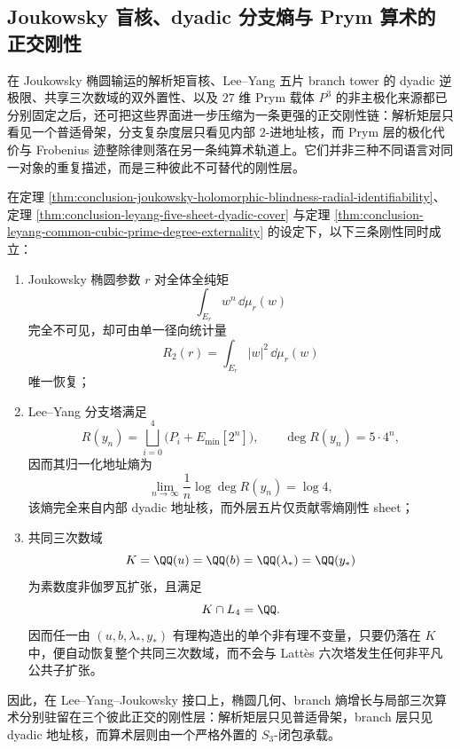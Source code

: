 \subsection{Joukowsky 盲核、dyadic 分支熵与 Prym 算术的正交刚性}\label{subsec:conclusion-joukowsky-branch-prym-address-entropy-orthogonality}

在 Joukowsky 椭圆输运的解析矩盲核、Lee--Yang 五片 branch tower 的 dyadic 逆极限、共享三次数域的双外置性、以及 \(27\) 维 Prym 载体 \(P^3\) 的非主极化来源都已分别固定之后，还可把这些界面进一步压缩为一条更强的正交刚性链：解析矩层只看见一个普适骨架，分支复杂度层只看见内部 \(2\)-进地址核，而 Prym 层的极化代价与 Frobenius 迹整除律则落在另一条纯算术轨道上。它们并非三种不同语言对同一对象的重复描述，而是三种彼此不可替代的刚性层。

\begin{theorem}\label{thm:conclusion-joukowsky-branch-cubic-three-layer-orthogonality}
在定理 \ref{thm:conclusion-joukowsky-holomorphic-blindness-radial-identifiability}、定理 \ref{thm:conclusion-leyang-five-sheet-dyadic-cover} 与定理 \ref{thm:conclusion-leyang-common-cubic-prime-degree-externality} 的设定下，以下三条刚性同时成立：
\begin{enumerate}
  \item Joukowsky 椭圆参数 \(r\) 对全体全纯矩
  \[
  \int_{E_r} w^n\,\dd\mu_r(w)
  \]
  完全不可见，却可由单一径向统计量
  \[
  R_2(r)=\int_{E_r}|w|^2\,\dd\mu_r(w)
  \]
  唯一恢复；
  \item Lee--Yang 分支塔满足
  \[
  R(y_n)=\bigsqcup_{i=0}^{4}\bigl(P_i+E_{\min}[2^n]\bigr),
  \qquad
  \deg R(y_n)=5\cdot 4^n,
  \]
  因而其归一化地址熵为
  \[
  \lim_{n\to\infty}\frac1n\log \deg R(y_n)=\log 4,
  \]
  该熵完全来自内部 dyadic 地址核，而外层五片仅贡献零熵刚性 sheet；
  \item 共同三次数域
  \[
  K=\QQ(u)=\QQ(b)=\QQ(\lambda_*)=\QQ(y_*)
  \]
  为素数度非伽罗瓦扩张，且满足
  \[
  K\cap L_4=\QQ.
  \]
  因而任一由 \((u,b,\lambda_*,y_*)\) 有理构造出的单个非有理不变量，只要仍落在 \(K\) 中，便自动恢复整个共同三次数域，而不会与 Latt\`es 六次塔发生任何非平凡公共子扩张。
\end{enumerate}
因此，在 Lee--Yang--Joukowsky 接口上，椭圆几何、branch 熵增长与局部三次算术分别驻留在三个彼此正交的刚性层：解析矩层只见普适骨架，branch 层只见 dyadic 地址核，而算术层则由一个严格外置的 \(S_3\)-闭包承载。
\end{theorem}
